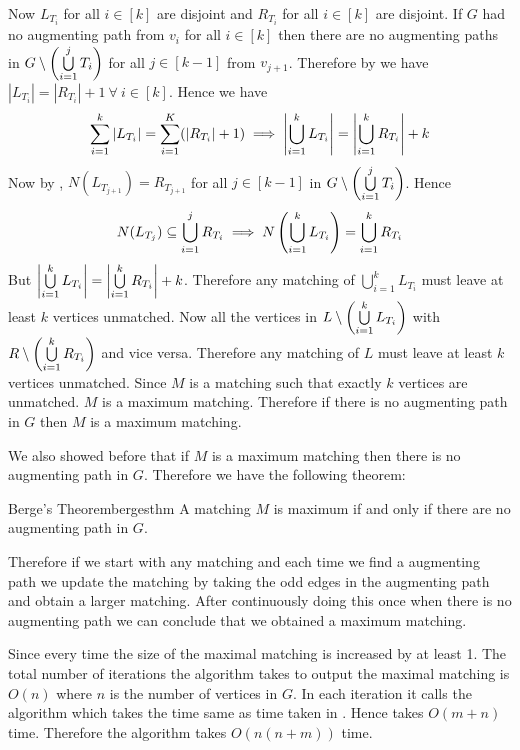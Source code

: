 Now $L_{T_i}$ for all $i\in[k]$ are disjoint and $R_{T_i}$ for all $i\in[k]$ are disjoint. If $G$ had no augmenting path from $v_i$ for all $i\in[k]$ then there are no augmenting paths in $G\setminus\left(\bigcup\limits_{i=1}^{j}T_i\right)$ for all $j\in[k-1]$ from $v_{j+1}$. Therefore by  we have $|L_{T_i}|=|R_{T_i}|+1\ \forall\ i\in[k]$. Hence we have $$\sum\limits_{i=1}^k |L_{T_i}|=\sum_{i=1}^K (|R_{T_i}|+1)\implies\left| \bigcup_{i=1}^k L_{T_i}\right|=\left|\bigcup_{i=1}^k R_{T_i}\right|+k$$Now by , $N(L_{T_{j+1}})=R_{T_{j+1}}$ for all $j\in[k-1]$ in $G\setminus\left(\bigcup\limits_{i=1}^{j}T_i\right)$. Hence $$N(L_{T_j})\subseteq \bigcup\limits_{i=1}^jR_{T_i}\implies N\left( \bigcup\limits_{i=1}^k L_{T_i} \right)=\bigcup\limits_{i=1}^kR_{T_i}$$But $\left| \bigcup\limits_{i=1}^k L_{T_i}\right|=\left|\bigcup\limits_{i=1}^k R_{T_i}\right|+k$. Therefore any matching of $\bigcup\limits_{i=1}^kL_{T_i}$ must leave at least $k$ vertices unmatched. Now all the vertices in $L\setminus \left(\bigcup\limits_{i=1}^kL_{T_i}\right)$ with $R\setminus \left(\bigcup\limits_{i=1}^kR_{T_i}\right)$ and vice versa. Therefore any matching of $L$ must leave at least $k$ vertices unmatched. Since $M$ is a matching such that exactly $k$ vertices are unmatched. $M$ is a maximum matching. Therefore if there is no augmenting path in $G$ then $M$ is a maximum matching. 

We also showed before that if $M$ is a maximum matching then there is no augmenting path in $G$. Therefore we have the following theorem:
\begin{Theorem}{Berge's Theorem}{bergesthm}
	A matching $M$ is maximum if and only if there are no augmenting path in $G$.
\end{Theorem}

Therefore if we start with any matching and each time we find a augmenting path we update the matching by taking the odd edges in the augmenting path and obtain a larger matching. After continuously doing this once when there is no augmenting path we can conclude that we obtained a maximum matching. 

\begin{algorithm}
\caption{$(G)$}
\DontPrintSemicolon
{}
\end{algorithm}
Since every time the size of the maximal matching is increased by at least 1. The total number of iterations the algorithm takes to output the maximal matching is $O(n)$ where $n$ is the number of vertices in $G$.  In each iteration it calls the  algorithm which takes the time same as time taken in . Hence  takes $O(m+n)$ time. Therefore the  algorithm takes $O(n(n+m))$ time. 

